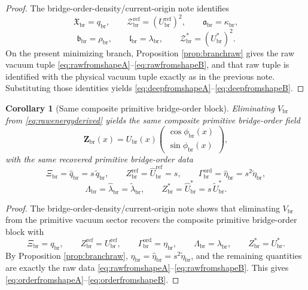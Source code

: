 \documentclass[11pt]{article}
\newcommand{\RespOrderField}{\bm Z_{\mathrm{br}}}
\newcommand{\RespOrderReadout}{\Xi_{\mathrm{br}}}
\newcommand{\RespOrderRef}{Z_{\mathrm{br}}^{\mathrm{ref}}}
\newcommand{\RespOrderStiff}{\Gamma_{\mathrm{br}}^{\mathrm{ord}}}
\newcommand{\RespOrderQuartic}{\Lambda_{\mathrm{br}}}
\newcommand{\RespOrderEq}{Z_{\mathrm{br}}^{\ast}}
\newcommand{\RespDeepReadout}{\mathfrak X_{\mathrm{br}}}
\newcommand{\RespDeepDensityRef}{\mathcal Z_{\mathrm{br}}^{\mathrm{ref}}}
\newcommand{\RespDeepTrack}{\mathfrak a_{\mathrm{br}}}
\newcommand{\RespDeepRelax}{\mathfrak b_{\mathrm{br}}}
\newcommand{\RespDeepWell}{\mathfrak l_{\mathrm{br}}}
\newcommand{\RespDeepDensityEq}{\mathcal Z_{\mathrm{br}}^{\ast}}
\newcommand{\RespVacAmp}{U_{\mathrm{br}}}
\newcommand{\RespVacRef}{U_{\mathrm{br}}^{\mathrm{ref}}}
\newcommand{\RespVacEq}{U_{\mathrm{br}}^{\ast}}
\newcommand{\RespVacPhase}{\phi_{\mathrm{br}}}
\newcommand{\RespVacCarrier}{V_{\mathrm{br}}}
\newcommand{\RespVacReadout}{q_{\mathrm{br}}}
\newcommand{\RespVacCov}{\kappa_{\mathrm{br}}}
\newcommand{\RespVacRelax}{\rho_{\mathrm{br}}}
\newcommand{\RespVacWell}{\lambda_{\mathrm{br}}}
\newcommand{\RespVacIso}{\eta_{\mathrm{br}}}
\newcommand{\RespRawReadout}{\widehat q_{\mathrm{br}}}
\newcommand{\RespRawRef}{\widehat U_{\mathrm{br}}^{\mathrm{ref}}}
\newcommand{\RespRawWell}{\widehat\lambda_{\mathrm{br}}}
\newcommand{\RespRawEq}{\widehat U_{\mathrm{br}}^{\ast}}
\newcommand{\RespRawIso}{\widehat\eta_{\mathrm{br}}}
\newcommand{\RespShapeReadout}{\widetilde q_{\mathrm{br}}}
\newcommand{\RespShapeWell}{\widetilde\lambda_{\mathrm{br}}}
\newcommand{\RespShapeEq}{\widetilde U_{\mathrm{br}}^{\ast}}
\newcommand{\RespShapeIso}{\widetilde\eta_{\mathrm{br}}}
\newtheorem{corollary}{Corollary}
\begin{document}
\begin{proof}
The bridge-order-density/current-origin note identifies
\[
\RespDeepReadout=\RespVacReadout,
\qquad
\RespDeepDensityRef=(\RespVacRef)^2,
\qquad
\RespDeepTrack=\RespVacCov,
\]
\[
\RespDeepRelax=\RespVacRelax,
\qquad
\RespDeepWell=\RespVacWell,
\qquad
\RespDeepDensityEq=(\RespVacEq)^2.
\]
On the present minimizing branch, Proposition \ref{prop:branchraw} gives the raw vacuum tuple \eqref{eq:rawfromshapeA}--\eqref{eq:rawfromshapeB}, and that raw tuple is identified with the physical vacuum tuple exactly as in the previous note. Substituting those identities yields \eqref{eq:deepfromshapeA}--\eqref{eq:deepfromshapeB}.
\end{proof}

\begin{corollary}[Same composite primitive bridge-order block]
\label{cor:sameorderblock}
Eliminating \(\RespVacCarrier\) from \eqref{eq:rawenergyderived} yields the same composite primitive bridge-order field
\begin{equation}
\RespOrderField(x)
=
\RespVacAmp(x)
\begin{pmatrix}
\cos\RespVacPhase(x)\\
\sin\RespVacPhase(x)
\end{pmatrix},
\label{eq:raworderfield}
\end{equation}
with the same recovered primitive bridge-order data
\begin{equation}
\RespOrderReadout=\RespRawReadout=s\,\RespShapeReadout,
\qquad
\RespOrderRef=\RespRawRef=s,
\qquad
\RespOrderStiff=\RespRawIso=s^2\RespShapeIso,
\label{eq:orderfromshapeA}
\end{equation}
\begin{equation}
\RespOrderQuartic=\RespRawWell=\RespShapeWell,
\qquad
\RespOrderEq=\RespRawEq=s\,\RespShapeEq.
\label{eq:orderfromshapeB}
\end{equation}
\end{corollary}

\begin{proof}
The bridge-order-density/current-origin note shows that eliminating \(\RespVacCarrier\) from the primitive vacuum sector recovers the composite primitive bridge-order block with
\[
\RespOrderReadout=\RespVacReadout,
\qquad
\RespOrderRef=\RespVacRef,
\qquad
\RespOrderStiff=\RespVacIso,
\qquad
\RespOrderQuartic=\RespVacWell,
\qquad
\RespOrderEq=\RespVacEq.
\]
By Proposition \ref{prop:branchraw}, \(\RespVacIso=\RespRawIso=s^2\RespShapeIso\), and the remaining quantities are exactly the raw data \eqref{eq:rawfromshapeA}--\eqref{eq:rawfromshapeB}. This gives \eqref{eq:orderfromshapeA}--\eqref{eq:orderfromshapeB}.
\end{proof}
\end{document}
